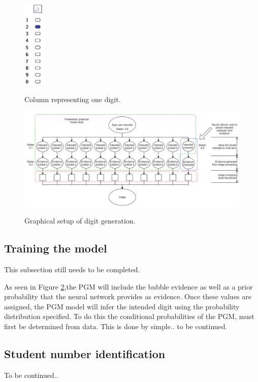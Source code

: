\begin{figure}
  \centering
  \includegraphics[width=1cm]{column}\\
  \caption{Column representing one digit.}
  \label{fig:column}
\end{figure}

\begin{figure}
  \centering
  \includegraphics[width=16cm]{pgmDigit}\\
  \caption{Graphical setup of digit generation.}
  \label{fig:pgmDigit}
\end{figure}


\subsection{Training the model}

This subsection still needs to be completed.

As seen in Figure \ref{fig:pgmDigit},the PGM will include the bubble evidence as well as a prior probability that the neural network provides as evidence. Once these values are assigned, the PGM model will infer the intended digit using the probability distribution specified. To do this the conditional probabilities of the PGM, must first be determined from data. This is done by simple.. to be continued.


\subsection{Student number identification}
\label{sec:pgmStudentNum}
To be continued..

